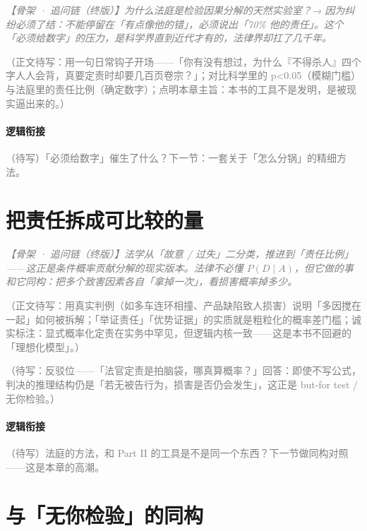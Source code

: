 \documentclass[../../main2.tex]{subfiles}
\begin{document}
	\textcolor{gray}{\textit{【骨架 · 追问链（终版）】为什么法庭是检验因果分解的天然实验室？→ 因为纠纷必须了结：不能停留在「有点像他的错」，必须说出「70\% 他的责任」。这个「必须给数字」的压力，是科学界直到近代才有的，法律界却扛了几千年。}}

	\textcolor{gray}{（正文待写：用一句日常钩子开场——「你有没有想过，为什么『不得杀人』四个字人人会背，真要定责时却要几百页卷宗？」；对比科学里的 p<0.05（模糊门槛）与法庭里的责任比例（确定数字）；点明本章主旨：本书的工具不是发明，是被现实逼出来的。）}

	\paragraph*{逻辑衔接}
	\textcolor{gray}{（待写）「必须给数字」催生了什么？下一节：一套关于「怎么分锅」的精细方法。}

	\section{把责任拆成可比较的量}
	\label{sec:court-decompose}

	\textcolor{gray}{\textit{【骨架 · 追问链（终版）】法学从「故意 / 过失」二分类，推进到「责任比例」——这正是条件概率贡献分解的现实版本。法律不必懂 $P(D\mid A)$，但它做的事和它同构：把多个致害因素各自「拿掉一次」，看损害概率掉多少。}}

	\textcolor{gray}{（正文待写：用真实判例（如多车连环相撞、产品缺陷致人损害）说明「多因搅在一起」如何被拆解；「举证责任」「优势证据」的实质就是粗粒化的概率差门槛；诚实标注：显式概率化定责在实务中罕见，但逻辑内核一致——这是本书不回避的「理想化模型」。）}

	\begin{questionbox}
		\textcolor{gray}{（待写：反驳位——「法官定责是拍脑袋，哪真算概率？」回答：即使不写公式，判决的推理结构仍是「若无被告行为，损害是否仍会发生」，这正是 but-for test / 无你检验。）}
	\end{questionbox}

	\paragraph*{逻辑衔接}
	\textcolor{gray}{（待写）法庭的方法，和 Part II 的工具是不是同一个东西？下一节做同构对照——这是本章的高潮。}

	\section{与「无你检验」的同构}
	\label{sec:court-isomorphism}
\end{document}
